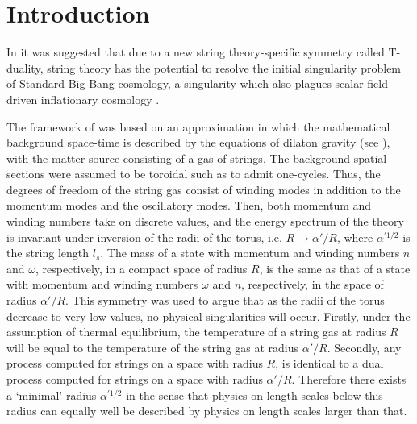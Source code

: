 \documentclass[a4paper,twocolumn,nofootinbib,tightenlines,prd,aps,
               superscriptaddress]{revtex4} %
\newcommand{\al}{\alpha}
\begin{document}
\maketitle %


\section{Introduction}

In \cite{Brandenberger:1989aj} it was suggested that due to a new
string theory-specific symmetry called T-duality, string theory
has the potential to resolve the initial singularity problem of
Standard Big Bang cosmology, a singularity which also plagues
scalar field-driven inflationary cosmology
\cite{Borde:1994xh,Borde:2001nh}.

The framework of \cite{Brandenberger:1989aj} was based on an
approximation in which the mathematical background space-time is
described by the equations of dilaton gravity (see
\cite{Tseytlin:1992xk,Veneziano:1991ek}), with the matter source
consisting of a gas of strings. The background spatial sections
were assumed to be toroidal such as to admit one-cycles. Thus, the
degrees of freedom of the string gas consist of winding modes in
addition to the momentum modes and the oscillatory modes. Then,
both momentum and winding numbers take on discrete values, and the
energy spectrum of the theory is invariant under inversion of the
radii of the torus, i.e. $R \rightarrow \al'/R$, where $\al^{'
1/2}$ is the string length $l_s$. The mass of a state with
momentum and winding numbers $n$ and $\omega$, respectively, in a
compact space of radius $R$, is the same as that of a state with
momentum and winding numbers $\omega$ and $n$, respectively, in
the space of radius $\al'/ R$. This symmetry was used to argue
\cite{Brandenberger:1989aj} that as the radii of the torus
decrease to very low values, no physical singularities will occur.
Firstly, under the assumption of thermal equilibrium, the
temperature of a string gas at radius $R$ will be equal to the
temperature of the string gas at radius $\al'/ R$. Secondly, any
process computed for strings on a space with radius $R$, is
identical to a dual process computed for strings on a  space with
radius $\al'/ R$. Therefore there exists a `minimal' radius
$\al^{' 1/2}$ in the sense that physics on length scales below
this radius can equally well be described by physics on length
scales larger than that.
\end{document}

